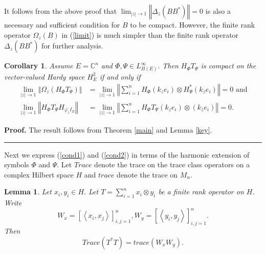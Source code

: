 \documentclass{article}%
\newtheorem{corollary}[theorem]{Corollary}
\newtheorem{lemma}[theorem]{Lemma}
\newenvironment{proof}[1][Proof]{\noindent\textbf{#1.} }{\ \rule{0.5em}{0.5em}}
\begin{document}
It follows from the above proof that $\lim_{\left\vert z\right\vert
\rightarrow1}\left\Vert \Delta_{z}(BB^{\ast})\right\Vert =0$ is also a
necessary and sufficient condition for $B$ to be compact. However, the finite
rank operator $\Omega_{z}(B)$ in (\ref{limit}) is much simpler than the finite
rank operator $\Delta_{z}(BB^{\ast})$ for further analysis.

\begin{corollary}
\label{corlllary3.6} Assume $E=\mathbb{C}^{n}$ and $\Phi,\Psi\in
L_{B(E)}^{\infty}.$ Then $H_{\Phi}T_{\Psi}$ is compact on the vector-valued
Hardy space $H_{E}^{2}$ if and only if
\begin{align}
\lim_{\left\vert z\right\vert \rightarrow1}\left\Vert \Omega_{z}(H_{\Phi
}T_{\Psi})\right\Vert  &  =\lim_{\left\vert z\right\vert \rightarrow
1}\left\Vert \sum_{i=1}^{n}H_{\Phi}\left(  k_{z}e_{i}\right)  \otimes H_{\Psi
}^{\ast}\left(  k_{\overline{z}}e_{i}\right)  \right\Vert =0\text{ and
}\label{cond1}\\
\lim_{\left\vert z\right\vert \rightarrow1}\left\Vert H_{\Phi}T_{\Psi
}H_{\overline{\varphi_{\overline{z}}}I_{E}}\right\Vert  &  =\lim_{\left\vert
z\right\vert \rightarrow1}\left\Vert \sum_{i=1}^{n}H_{\Phi}T_{\Psi}\left(
k_{z}e_{i}\right)  \otimes\left(  k_{\overline{z}}e_{i}\right)  \right\Vert
=0. \label{cond2}%
\end{align}

\end{corollary}

\begin{proof}
The result follows from Theorem \ref{main} and Lemma \ref{key}.
\end{proof}

Next we express (\ref{cond1}) and (\ref{cond2}) in terms of the harmonic
extension of symbols $\Phi$ and $\Psi.$ Let $Trace$ denote the trace on the
trace class operators on a complex Hilbert space $H$ and $trace$ denote the
trace on $M_{n}.$

\begin{lemma}
\label{trace}Let $x_{i},y_{i}\in H.$ Let $T=\sum_{i=1}^{n}x_{i}\otimes y_{i}$
be a finite rank operator on $H$. Write%
\[
W_{x}=\left[  \left\langle x_{i},x_{j}\right\rangle \right]  _{i,j=1}%
^{n},W_{y}=\left[  \left\langle y_{i},y_{j}\right\rangle \right]  _{i,j=1}%
^{n}.
\]
Then
\[
Trace(T^{\ast}T)=trace\left(  W_{x}W_{y}\right)  .
\]

\end{lemma}
\end{document}
